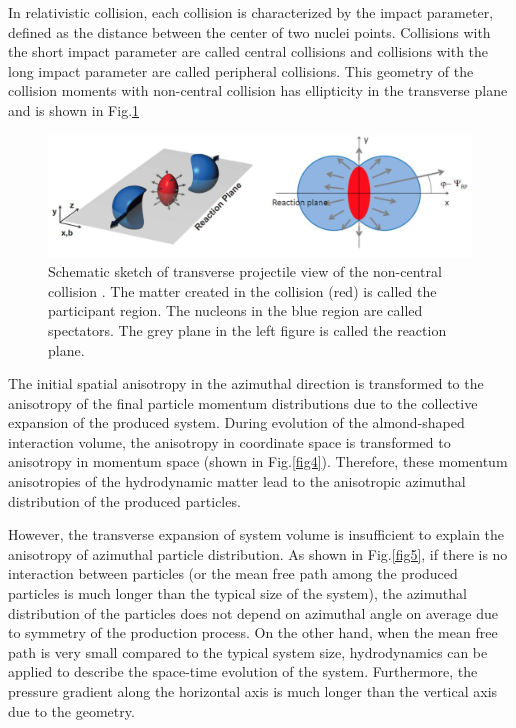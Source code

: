 	 In relativistic collision, each collision is characterized by the impact parameter, defined as the distance between the center of two nuclei points. Collisions with the short impact parameter are called central collisions and collisions with the long impact parameter are called peripheral collisions.  This geometry of the collision moments with non-central collision has ellipticity in the transverse plane and is shown in Fig.\ref{fig3}
	
\begin{figure}[t]
\centerline{\includegraphics[width=13.0cm]{figures/flow_clasic}}
\caption{Schematic sketch of transverse projectile view of the non-central collision \cite{Snellings:2011sz}. The matter created in the collision (red) is called the participant region. The nucleons in the blue region are called spectators. The grey plane in the left figure is called the reaction plane.}
\label{fig3}
\end{figure}

	The initial spatial anisotropy in the azimuthal direction is transformed to the anisotropy of the final particle momentum distributions due to the collective expansion of the produced system. During evolution of the almond-shaped interaction volume, the anisotropy in coordinate space is transformed to anisotropy in momentum space (shown in Fig.\ref{fig4}). Therefore, these momentum anisotropies of the hydrodynamic matter lead to the anisotropic azimuthal distribution of the produced particles. 
	
	However, the transverse expansion of system volume is insufficient to explain the anisotropy of azimuthal particle distribution. As shown in Fig.\ref{fig5}, if there is no interaction between particles (or the mean free path among the produced particles is much longer than the typical size of the system), the azimuthal distribution of the particles does not depend on azimuthal angle on average due to symmetry of the production process. On the other hand, when the mean free path is very small compared to the typical system size, hydrodynamics can be applied to describe the space-time evolution of the system. Furthermore, the pressure gradient along the horizontal axis is much longer than the vertical axis due to the geometry.
 

